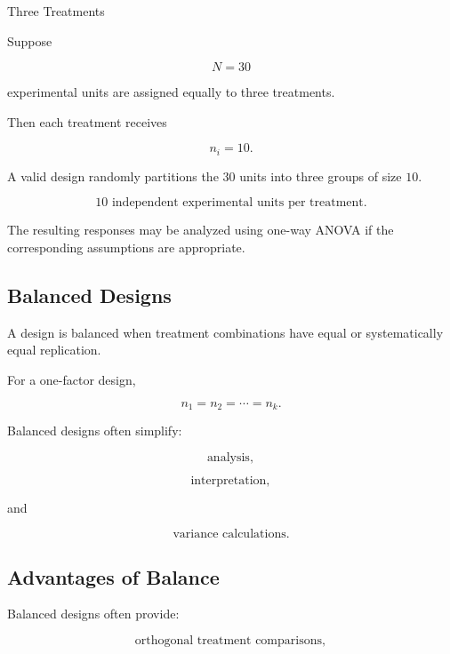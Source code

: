 \begin{workedexamplebox}{Three Treatments}

Suppose

\[
N=30
\]

experimental units are assigned equally to three treatments.

Then each treatment receives

\[
n_i=10.
\]

A valid design randomly partitions the \(30\) units into three groups of
size \(10\).

\begin{answerbox}
\[
\boxed{
10
\text{ independent experimental units per treatment}.
}
\]
\end{answerbox}

The resulting responses may be analyzed using one-way ANOVA if the
corresponding assumptions are appropriate.

\end{workedexamplebox}

\subsection{Balanced Designs}
\label{subsec:balanced-design}

A design is balanced when treatment combinations have equal or
systematically equal replication.

For a one-factor design,

\[
\boxed{
n_1=n_2=\cdots=n_k.
}
\]

Balanced designs often simplify:

\[
\boxed{
\text{analysis},
}
\]

\[
\boxed{
\text{interpretation},
}
\]

and

\[
\boxed{
\text{variance calculations}.
}
\]

\subsection{Advantages of Balance}
\label{subsec:advantages-balance}

Balanced designs often provide:

\[
\boxed{
\text{orthogonal treatment comparisons},
}
\]

